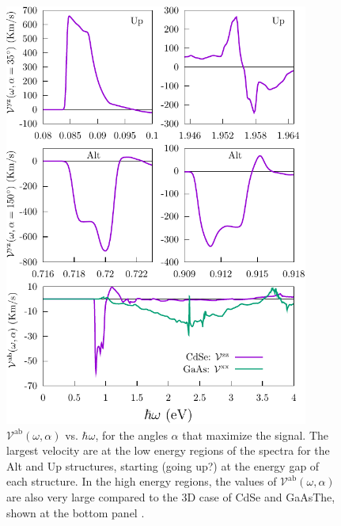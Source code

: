 \documentclass[floatfix,prb,aps,superscriptaddress,showpacs,11pt,preprint,letterpaper]{revtex4}
\def\tama{10cm}
\begin{document}
\begin{figure}[t]
\centering
\includegraphics[width=\tama]{figures/fig3}
\caption{$\mathcal{V}^{\mathrm{ab}}(\omega,\alpha)$ 
  vs. $\hbar\omega$, for the angles $\alpha$ that maximize the signal. The
  largest velocity are at the low energy regions of the spectra for the Alt and
  Up structures, starting {\color{red}(going up?)} at the energy gap of each
  structure. In the high energy regions, the values of
  $\mathcal{V}^{\mathrm{ab}}(\omega,\alpha)$ are also very large compared to
  the 3D case of CdSe and GaAsThe, shown at the bottom panel . }
\label{fig:vab-str-comp}
\end{figure}
\end{document}
